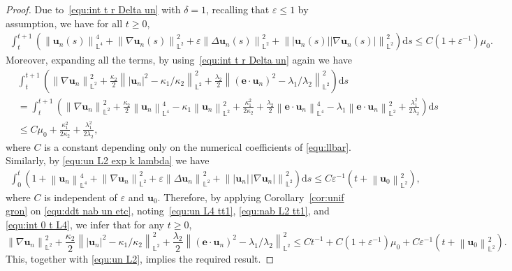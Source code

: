 \documentclass[11pt, reqno]{amsart}
\theoremstyle{definition}
\numberwithin{equation}{section}
\newcommand{\bff}{\boldsymbol}
\newcommand{\bb}{\mathbb}
\newcommand{\ds}{\mathrm{d}s}
\newcommand{\norm}[2]{\left\|{#1}\right\|_{#2}}
\begin{document}
\begin{proof}
Due to~\eqref{equ:int t r Delta un} with $\delta=1$, recalling that $\varepsilon\leq 1$ by assumption, we have for all $t\geq 0$,
\begin{align}\label{equ:un L4 tt1}
    \int_t^{t+1} \left(\norm{\bff{u}_n(s)}{\bb{L}^4}^4 + \norm{\nabla \bff{u}_n(s)}{\bb{L}^2}^2 + \varepsilon \norm{\Delta \bff{u}_n(s)}{\bb{L}^2}^2 + \norm{|\bff{u}_n(s)| |\nabla \bff{u}_n(s)|}{\bb{L}^2}^2 \right) \ds 
    \leq C(1+\varepsilon^{-1}) \mu_0.
\end{align}
Moreover, expanding all the terms, by using~\eqref{equ:int t r Delta un} again we have
\begin{align}\label{equ:nab L2 tt1}
    &\int_t^{t+1} \left(
		\norm{\nabla \bff{u}_n}{\bb{L}^2}^2
        +
        \frac{\kappa_2}{2} \norm{ |\bff{u}_n|^2 - \kappa_1/\kappa_2}{\bb{L}^2}^2
        +
        \frac{\lambda_2}{2} \norm{(\bff{e}\cdot \bff{u}_n)^2- \lambda_1/\lambda_2}{\bb{L}^2}^2 \right) \ds
        \nonumber\\
     &=
     \int_t^{t+1} \left( \norm{\nabla \bff{u}_n}{\bb{L}^2}^2
     +
     \frac{\kappa_2}{2} \norm{\bff{u}_n}{\bb{L}^4}^4
     - \kappa_1 \norm{\bff{u}_n}{\bb{L}^2}^2
     + \frac{\kappa_1^2}{2\kappa_2}
     + 
     \frac{\lambda_2}{2} \norm{\bff{e}\cdot \bff{u}_n}{\bb{L}^4}^4
     - \lambda_1 \norm{\bff{e}\cdot \bff{u}_n}{\bb{L}^2}^2
     + \frac{\lambda_1^2}{2\lambda_2} \right) \ds
     \nonumber\\
     &\leq
     C\mu_0+ \frac{\kappa_1^2}{2\kappa_2}+ \frac{\lambda_1^2}{2\lambda_2},
\end{align}
where $C$ is a constant depending only on the numerical coefficients of \eqref{equ:llbar}. Similarly, by \eqref{equ:un L2 exp k lambda} we have
\begin{align}\label{equ:int 0 t L4}
    \int_0^t \left(1+ \norm{\bff{u}_n}{\bb{L}^4}^4 
        +
        \norm{\nabla \bff{u}_n}{\bb{L}^2}^2
        +
        \varepsilon \norm{\Delta \bff{u}_n}{\bb{L}^2}^2
        +
		\norm{|\bff{u}_n|\, |\nabla \bff{u}_n|}{\bb{L}^2}^2 \right) \ds 
        \leq
        C\varepsilon^{-1} \left(t+ \norm{\bff{u}_0}{\bb{L}^2}^2\right),
\end{align}
where $C$ is independent of $\varepsilon$ and $\bff{u}_0$.
Therefore, by applying Corollary~\ref{cor:unif gron} on \eqref{equ:ddt nab un etc}, noting~\eqref{equ:un L4 tt1}, \eqref{equ:nab L2 tt1}, and \eqref{equ:int 0 t L4}, we infer that for any $t\geq 0$,
\begin{equation*}
    \norm{\nabla \bff{u}_n}{\bb{L}^2}^2 +
        \frac{\kappa_2}{2} \norm{ |\bff{u}_n|^2 - \kappa_1/\kappa_2}{\bb{L}^2}^2
        +
        \frac{\lambda_2}{2} \norm{(\bff{e}\cdot \bff{u}_n)^2- \lambda_1/\lambda_2}{\bb{L}^2}^2
        \leq 
        Ct^{-1}+ C(1+\varepsilon^{-1})\mu_0+C\varepsilon^{-1} \left(t+ \norm{\bff{u}_0}{\bb{L}^2}^2\right).
\end{equation*}
This, together with \eqref{equ:un L2}, implies the required result.
\end{proof}
\end{document}
